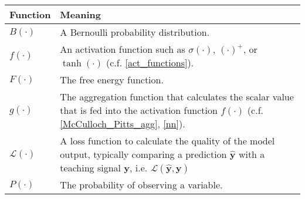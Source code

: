\begin{tabular}{ p{3cm} p{11cm} }
	\textbf{Function} & \textbf{Meaning}\\
	\hline
    $B(\cdot)$ & A Bernoulli probability distribution.\\
	$f(\cdot)$ & An activation function such as $\sigma(\cdot)$, $(\cdot)^{+}$, or $\tanh(\cdot)$ (c.f. \eqref{act_functions}).\\
    $F(\cdot)$ & The free energy function.\\
	$g(\cdot)$ & The aggregation function that calculates the scalar value that is fed into the activation function $f(\cdot)$ (c.f. \eqref{McCulloch_Pitts_agg},  \eqref{nn}).\\
    $\mathcal{L}(\cdot)$ & A loss function to calculate the quality of the model output, typically comparing a prediction $\boldsymbol{\hat{y}}$ with a teaching signal $\boldsymbol{y}$, i.e. $\mathcal{L}(\boldsymbol{\hat{y}}, \boldsymbol{y})$\\
    $P(\cdot)$ & The probability of observing a variable.\\
\end{tabular}
\renewcommand{\arraystretch}{1}






